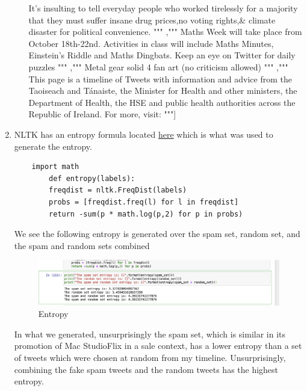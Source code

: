 \documentclass{article}
\begin{document}
\begin{enumerate}
\begin{itemize}
	It’s insulting to tell everyday people who worked tirelessly for a majority that they must suffer insane drug prices,no voting rights,\& climate disaster for political convenience.
	"""
	,"""
	Maths Week will take place from October 18th-22nd. Activities in class will include Maths Minutes, Einstein's Riddle and Maths Dingbats. Keep an eye on Twitter for daily puzzles
	"""
	,"""
	Metal gear solid 4 fan art (no criticism allowed)
	"""
	,"""
	This page is a timeline of Tweets with information and advice from the Taoiseach and Tánaiste, the Minister for Health and other ministers, the Department of Health, the HSE and public health authorities across the Republic of Ireland. For more, visit: 
	"""]
	\end{itemize}
\item NLTK has an entropy formula located \href{https://www.nltk.org/book/ch06.html}{here} which is what was used to generate the entropy. 
\begin{verbatim}
	import math
		def entropy(labels):
		freqdist = nltk.FreqDist(labels)
		probs = [freqdist.freq(l) for l in freqdist]
		return -sum(p * math.log(p,2) for p in probs)
\end{verbatim}
	We see the following entropy is generated over the spam set, random set, and the spam and random sets combined
		\begin{figure}[!h]
	\centering
	\includegraphics[width=0.75\linewidth]{entropy.png}
	\caption{Entropy}\label{ent}
\end{figure}
In what we generated, unsurprisingly the spam set, which is similar in its promotion of Mac StudioFlix in a sale context, has a lower entropy than a set of tweets which were chosen at random from my timeline. Unsurprisingly, combining the fake spam tweets and the random tweets has the highest entropy.
\end{enumerate}
\end{document}
